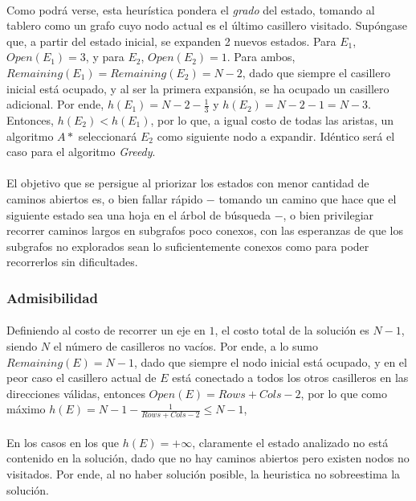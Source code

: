 \documentclass[12pt, twocolumn]{article}
\begin{document}
    \paragraph{} Como podrá verse, esta heurística pondera el \textit{grado} del estado, tomando al tablero como un grafo cuyo nodo actual es el último casillero visitado. Supóngase que, a partir del estado inicial, se expanden 2 nuevos estados. Para $E_{1}$, $Open(E_{1})=3$, y para $E_{2}$, $Open(E_{2}) = 1$. Para ambos, $Remaining(E_{1})=Remaining(E_{2})=N-2$, dado que siempre el casillero inicial está ocupado, y al ser la primera expansión, se ha ocupado un casillero adicional. Por ende, $h(E_{1})=N-2-\frac{1}{3}$ y $h(E_{2})=N-2-1=N-3$. Entonces, $h(E_{2}) < h(E_{1})$, por lo que, a igual costo de todas las aristas, un algoritmo $A*$ seleccionará $E_{2}$ como siguiente nodo a expandir. Idéntico será el caso para el algoritmo \textit{Greedy}. 
    
    \paragraph{} El objetivo que se persigue al priorizar los estados con menor cantidad de caminos abiertos es, o bien fallar rápido $-$ tomando un camino que hace que el siguiente estado sea una hoja en el árbol de búsqueda $-$, o bien privilegiar recorrer caminos largos en subgrafos poco conexos, con las esperanzas de que los subgrafos no explorados sean lo suficientemente conexos como para poder recorrerlos sin dificultades. 
	
	\subsubsection{Admisibilidad}
	
	\paragraph{} Definiendo al costo de recorrer un eje en $1$, el costo total de la solución es $N-1$, siendo $N$ el número de casilleros no vacíos. Por ende, a lo sumo $Remaining(E) = N-1$, dado que siempre el nodo inicial está ocupado, y en el peor caso el casillero actual de $E$ está conectado a todos los otros casilleros en las direcciones válidas, entonces $Open(E) = Rows + Cols - 2$, por lo que como máximo $h(E) = N-1-\frac{1}{Rows + Cols - 2} \le N-1$,
    
    \paragraph{} En los casos en los que $h(E) = +\infty$, claramente el estado analizado no está contenido en la solución, dado que no hay caminos abiertos pero existen nodos no visitados. Por ende, al no haber solución posible, la heuristica no sobreestima la solución.
    
\end{document}
